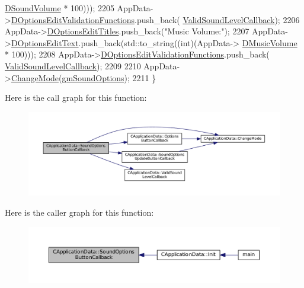 \begin{DoxyCode}
      \hyperlink{classCApplicationData_aa6e540f860dcb1929ef36ddce3be3691}{DSoundVolume} * 100)));
2205     AppData->\hyperlink{classCApplicationData_ab76fa444142de66fdb058f390e01112c}{DOptionsEditValidationFunctions}.push\_back(
      \hyperlink{classCApplicationData_ae3216a4fccd68c9657d7e936b1a6df67}{ValidSoundLevelCallback});
2206     AppData->\hyperlink{classCApplicationData_a7a322ef6b8c1db3e995c6b493230fd05}{DOptionsEditTitles}.push\_back(\textcolor{stringliteral}{"Music Volume:"});
2207     AppData->\hyperlink{classCApplicationData_a7044dc34cbd9d6776e8ef79eb12b5ce4}{DOptionsEditText}.push\_back(std::to\_string((\textcolor{keywordtype}{int})(AppData->
      \hyperlink{classCApplicationData_a8bc61af4a83a667102e55cca2a739c3b}{DMusicVolume} * 100)));
2208     AppData->\hyperlink{classCApplicationData_ab76fa444142de66fdb058f390e01112c}{DOptionsEditValidationFunctions}.push\_back(
      \hyperlink{classCApplicationData_ae3216a4fccd68c9657d7e936b1a6df67}{ValidSoundLevelCallback});
2209     
2210     AppData->\hyperlink{classCApplicationData_aee18c113e9a0acb3cad3d63eb19de71b}{ChangeMode}(\hyperlink{classCApplicationData_ac8ac37a4c8bb871036fbbdc6a072e403a3b63571023293bc10198d9128b5b8a16}{gmSoundOptions});
2211 \}
\end{DoxyCode}
Here is the call graph for this function\+:\nopagebreak
\begin{figure}[H]
\begin{center}
\leavevmode
\includegraphics[width=350pt]{classCApplicationData_a7169395ea835eaa9c98188d1b3583534_cgraph}
\end{center}
\end{figure}
Here is the caller graph for this function\+:\nopagebreak
\begin{figure}[H]
\begin{center}
\leavevmode
\includegraphics[width=350pt]{classCApplicationData_a7169395ea835eaa9c98188d1b3583534_icgraph}
\end{center}
\end{figure}
\hypertarget{classCApplicationData_ae63c8ca19ddeb92a3aaf0a5d67d09e58}{}\label{classCApplicationData_ae63c8ca19ddeb92a3aaf0a5d67d09e58} 

